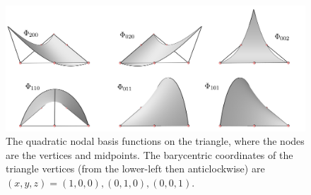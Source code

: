 \begin{figure}[H]
    \begin{center}
        \includegraphics[width=0.86\linewidth]{figures/basis_functions/quadratic_basis_text.png}
    \end{center}
    \caption{\scriptsize
        The quadratic nodal basis functions on the triangle, where the nodes are the vertices and midpoints.
        The barycentric coordinates of the triangle vertices (from the lower-left then anticlockwise) are $(x,y,z) = (1,0,0),(0,1,0),(0,0,1)$.
    }
    \label{quadratic_basis}
\end{figure}


